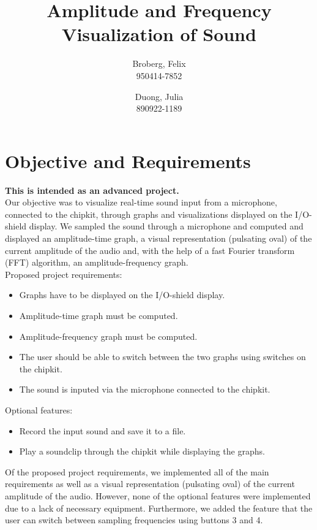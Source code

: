 \documentclass[a4paper,11pt]{article}
\author{
  Broberg, Felix\\
  950414-7852
  \and
  Duong, Julia\\
  890922-1189
}
\title{Amplitude and Frequency Visualization of Sound}
\begin{document}
\maketitle


\section*{Objective and Requirements}
\textbf{This is intended as an advanced project.}\\
Our objective was to visualize real-time sound input from a microphone, connected to the chipkit, through graphs and visualizations displayed on the I/O-shield display. We sampled the sound through a microphone and computed and displayed an amplitude-time graph, a visual representation (pulsating oval) of the current amplitude of the audio and, with the help of a fast Fourier transform (FFT) algorithm, an amplitude-frequency graph.\\
\newline
Proposed project requirements:

\begin{itemize}
\item Graphs have to be displayed on the I/O-shield display.
\item Amplitude-time graph must be computed.
\item Amplitude-frequency graph must be computed.
\item The user should be able to switch between the two graphs using switches on the chipkit.
\item The sound is inputed via the microphone connected to the chipkit.
\end{itemize}
Optional features:
\begin{itemize}
\item Record the input sound and save it to a file.
\item Play a soundclip through the chipkit while displaying the graphs.
\end{itemize}
Of the proposed project requirements, we implemented all of the main requirements as well as a visual representation (pulsating oval) of the current amplitude of the audio. However, none of the optional features were implemented due to a lack of necessary equipment. Furthermore, we added the feature that the user can switch between sampling frequencies using buttons 3 and 4. 


\end{document}

